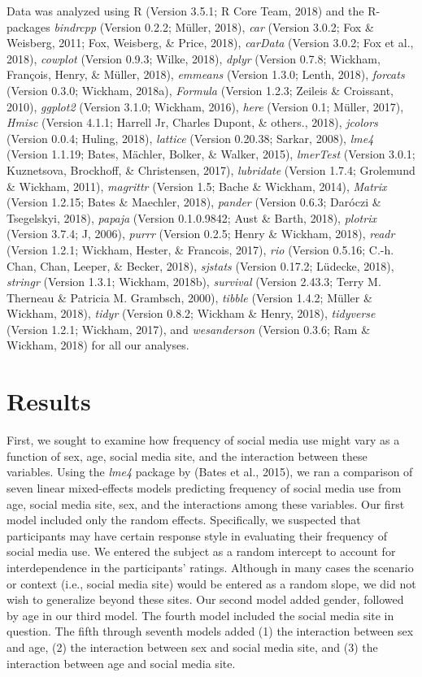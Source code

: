 \documentclass[man, fleqn, noextraspace]{apa6}
\theoremstyle{definition}
\theoremstyle{definition}
\theoremstyle{definition}
\theoremstyle{remark}
\begin{document}
Data was analyzed using R (Version 3.5.1; R Core Team, 2018) and the
R-packages \emph{bindrcpp} (Version 0.2.2; Müller, 2018), \emph{car}
(Version 3.0.2; Fox \& Weisberg, 2011; Fox, Weisberg, \& Price, 2018),
\emph{carData} (Version 3.0.2; Fox et al., 2018), \emph{cowplot}
(Version 0.9.3; Wilke, 2018), \emph{dplyr} (Version 0.7.8; Wickham,
François, Henry, \& Müller, 2018), \emph{emmeans} (Version 1.3.0; Lenth,
2018), \emph{forcats} (Version 0.3.0; Wickham, 2018a), \emph{Formula}
(Version 1.2.3; Zeileis \& Croissant, 2010), \emph{ggplot2} (Version
3.1.0; Wickham, 2016), \emph{here} (Version 0.1; Müller, 2017),
\emph{Hmisc} (Version 4.1.1; Harrell Jr, Charles Dupont, \& others.,
2018), \emph{jcolors} (Version 0.0.4; Huling, 2018), \emph{lattice}
(Version 0.20.38; Sarkar, 2008), \emph{lme4} (Version 1.1.19; Bates,
Mächler, Bolker, \& Walker, 2015), \emph{lmerTest} (Version 3.0.1;
Kuznetsova, Brockhoff, \& Christensen, 2017), \emph{lubridate} (Version
1.7.4; Grolemund \& Wickham, 2011), \emph{magrittr} (Version 1.5; Bache
\& Wickham, 2014), \emph{Matrix} (Version 1.2.15; Bates \& Maechler,
2018), \emph{pander} (Version 0.6.3; Daróczi \& Tsegelskyi, 2018),
\emph{papaja} (Version 0.1.0.9842; Aust \& Barth, 2018), \emph{plotrix}
(Version 3.7.4; J, 2006), \emph{purrr} (Version 0.2.5; Henry \& Wickham,
2018), \emph{readr} (Version 1.2.1; Wickham, Hester, \& Francois, 2017),
\emph{rio} (Version 0.5.16; C.-h. Chan, Chan, Leeper, \& Becker, 2018),
\emph{sjstats} (Version 0.17.2; Lüdecke, 2018), \emph{stringr} (Version
1.3.1; Wickham, 2018b), \emph{survival} (Version 2.43.3; Terry M.
Therneau \& Patricia M. Grambsch, 2000), \emph{tibble} (Version 1.4.2;
Müller \& Wickham, 2018), \emph{tidyr} (Version 0.8.2; Wickham \& Henry,
2018), \emph{tidyverse} (Version 1.2.1; Wickham, 2017), and
\emph{wesanderson} (Version 0.3.6; Ram \& Wickham, 2018) for all our
analyses.

\section{Results}\label{results}

First, we sought to examine how frequency of social media use might vary
as a function of sex, age, social media site, and the interaction
between these variables. Using the \emph{lme4} package by (Bates et al.,
2015), we ran a comparison of seven linear mixed-effects models
predicting frequency of social media use from age, social media site,
sex, and the interactions among these variables. Our first model
included only the random effects. Specifically, we suspected that
participants may have certain response style in evaluating their
frequency of social media use. We entered the subject as a random
intercept to account for interdependence in the participants' ratings.
Although in many cases the scenario or context (i.e., social media site)
would be entered as a random slope, we did not wish to generalize beyond
these sites. Our second model added gender, followed by age in our third
model. The fourth model included the social media site in question. The
fifth through seventh models added (1) the interaction between sex and
age, (2) the interaction between sex and social media site, and (3) the
interaction between age and social media site.
\end{document}
